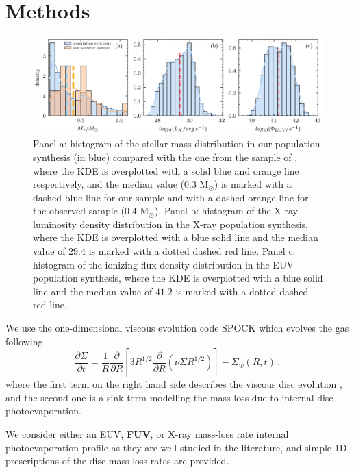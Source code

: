 \documentclass[fleqn,usenatbib]{mnras}
\begin{document}
\section{Methods}\label{sec:methods}
\begin{figure}
    \includegraphics{Fig1}
    \caption{Panel a: histogram of the stellar mass distribution in our population synthesis (in blue) compared with the one from the sample of , where the KDE is overplotted with a solid blue and orange line respectively, and the median value ($0.3$ M$_\odot$) is marked with a dashed blue line for our sample and with a dashed orange line for the observed sample ($0.4$ M$_\odot$). 
    Panel b: histogram of the X-ray luminosity density distribution in the X-ray population synthesis, where the KDE is overplotted with a blue solid line and the median value of $29.4$ is marked with a dotted dashed red line. Panel c: histogram of the ionizing flux density distribution in the EUV population synthesis, where the KDE is overplotted with a blue solid line and the median value of $41.2$ is marked with a dotted dashed red line.\label{fig:hist}}
\end{figure}

We use the one-dimensional viscous evolution code \textsc{SPOCK} \citep{Ercolano2015} which evolves the gas following
\begin{equation}
    \frac{\partial{\Sigma}}{\partial{t}} = \frac{1}{R}\frac{\partial}{\partial{R}}\left[3R^{1/2}\frac{\partial}{\partial{R}}(\nu\Sigma R^{1/2})\right] - \dot{\Sigma}_w(R,t)\,,
\end{equation}
where the first term on the right hand side describes the viscous disc evolution \citep{LyndenBell1974}, and the second one is a sink term modelling the mass-loss due to internal disc photoevaporation.

We consider either an EUV, \textbf{FUV}, or X-ray mass-loss rate internal photoevaporation profile as they are well-studied in the literature, and simple 1D prescriptions of the disc mass-loss rates are provided.
\end{document}
